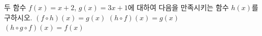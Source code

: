 두 함수 $f(x)=x+2$, $g(x)=3x+1$에 대하여 다음을 만족시키는 함수 $h(x)$를 구하시오.
 $(f\circ h)(x)=g(x)$
 $(h\circ f)(x)=g(x)$
 $(h\circ g\circ f)(x)=f(x)$
